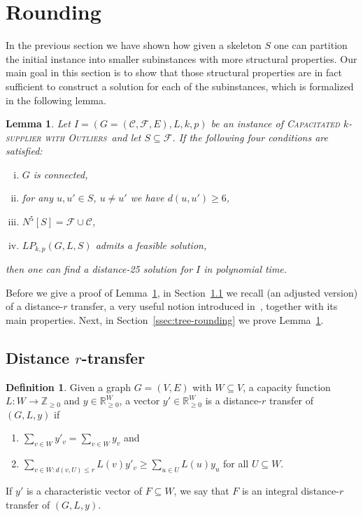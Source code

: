 \documentclass{article}
\newcommand{\F}{\mathcal{F}}
\newcommand{\C}{\mathcal{C}}
\newcommand{\pint}{\mathbb{Z}_{\ge 0}}
\newcommand{\preal}{\mathbb{R}_{\ge 0}}
\newcommand{\sub}{\subseteq}
\newcommand{\fullsup}{\textsc{Capacitated} $k$-\textsc{supplier with Outliers}}
\theoremstyle{plain}
\newtheorem{lemma}[theorem]{Lemma}
\theoremstyle{definition}
\newtheorem{definition}[theorem]{Definition}
\begin{document}
\section{Rounding}
\label{sec:rounding}

In the previous section we have shown how given a skeleton $S$
one can partition the initial instance into smaller subinstances
with more structural properties.
Our main goal in this section is to show that those structural
properties are in fact sufficient to construct a solution
for each of the subinstances, which is formalized in the following lemma.

\begin{lemma}\label{lem:tra}
Let $I=(G=(\C,\F,E),L,k,p)$ be an instance of \fullsup\  
and let $S \subseteq \F$.
If the following four conditions are satisfied:
\begin{enumerate}[(i)]
  \item $G$ is connected,
  \item\label{it:two} for any $u,u' \in S$, $u \neq u'$ we have $d(u,u') \ge 6$,
  \item\label{it:three} $N^5[S] = \F \cup \C$,
  \item $LP_{k,p}(G,L,S)$ admits a feasible solution,
\end{enumerate}
then one can find a distance-25 solution for $I$ in polynomial time.
\end{lemma}

Before we give a proof of Lemma~\ref{lem:tra},
in Section~\ref{ssec:transfer} we
recall (an adjusted version) of a distance-$r$
transfer, a very useful notion introduced in~\cite{svensson},
together with its main properties.
Next, in Section~\ref{ssec:tree-rounding} we
prove Lemma~\ref{lem:tra}.

\subsection{Distance $r$-transfer}
\label{ssec:transfer}

 \begin{definition}\label{def:tra}
Given a graph $G=(V,E)$ with $W\sub V$, a capacity function $L : W \to \pint$
and $y\in \preal^W$, a vector $y'\in \preal^W$ is a distance-$r$ transfer of
$(G,L,y)$ if
\begin{enumerate}
  \item $\sum_{v\in W} y'_v = \sum_{v\in W} y_v$ and
  \item\label{it:nei} $\sum_{v\in W : d(v,U)\le r} L(v)y'_v \ge \sum_{u\in
  U}L(u)y_u$ for all $U\sub W$.
\end{enumerate}
If $y'$ is a characteristic vector of $F\sub W$, we say that $F$ is an
integral distance-$r$ transfer of $(G,L,y)$.
\end{definition}
\end{document}
